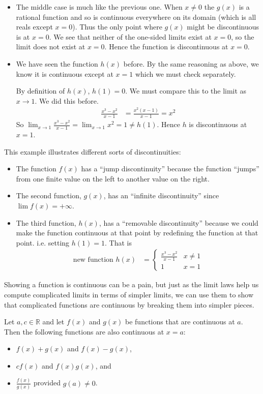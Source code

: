 \begin{eg}
\begin{itemize}
\item The middle case is much like the previous one. When $x \neq 0$ the $g(x)$
is a rational function and so is continuous everywhere on its domain (which is
all reals except $x=0$). Thus the only point where $g(x)$ might be discontinuous is at
$x=0$. We see that neither of the one-sided limits exist at $x=0$, so the limit
does not exist at $x=0$. Hence the function is discontinuous at $x=0$.

\item We have seen the function $h(x)$ before. By the same reasoning as
above, we know it is continuous except at $x=1$ which we must check separately.

By definition of $h(x)$, $h(1) = 0$. We must compare this to the limit as $x
\to 1$. We did this before.
\begin{align*}
	\frac{x^3-x^2}{x-1} &= \frac{x^2(x-1)}{x-1} = x^2
\end{align*}
So $\lim_{x \to 1} \frac{x^3-x^2}{x-1} = \lim_{x \to 1} x^2 
= 1\neq h(1)$. Hence $h$
is discontinuous at $x=1$.
\end{itemize}
\end{eg}

This example illustrates different sorts of discontinuities:
\begin{itemize}
\item The function $f(x)$ has a ``jump discontinuity'' because the function
``jumps'' from one finite value on the left to another value on the right.
\item The second function, $g(x)$, has an ``infinite discontinuity'' since
$\lim f(x) =+\infty$.
\item The third function, $h(x)$, has a ``removable discontinuity'' because we
could make the function continuous at that point by redefining the function at
that point. i.e. setting $h(1)=1$. That is
\begin{align*}
  \text{new function }h(x) &= \begin{cases}
    \frac{x^3-x^2}{x-1} & x\neq 1\\
    1 & x=1
    \end{cases}
\end{align*}
\end{itemize}


Showing a function is continuous can be a pain, but just as the limit laws help
us compute complicated limits in terms of simpler limits, we can use them to
show that complicated functions are continuous by breaking them into simpler
pieces.
\begin{theorem}\label{thm arith cont}
  Let $a,c \in \mathbb{R}$ and let $f(x)$ and $g(x)$ be functions that are
continuous at $a$. Then the following functions are also continuous at $x=a$:
\begin{itemize}
 \item $f(x) + g(x)$ and $f(x) - g(x)$,
 \item $c f(x)$ and $f(x) g(x)$, and
 \item $\frac{f(x)}{g(x)}$ provided $g(a) \neq 0$.
\end{itemize}
\end{theorem}

